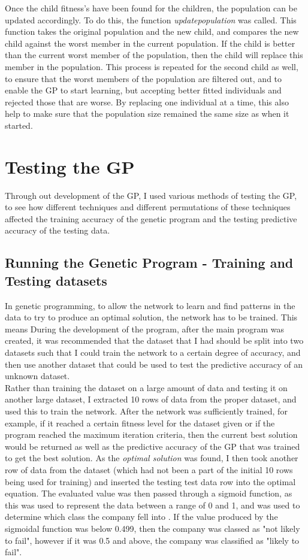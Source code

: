 \documentclass[11pt]{article}
\begin{document}
Once the child fitness's have been found for the children, the population can be updated accordingly. To do this, the function \textit{update\textunderscore population} was called. This function takes the original population and the new child, and compares the new child against the worst member in the current population. If the child is better than the current worst member of the population, then the child will replace this member in the population. This process is repeated for the second child as well, to ensure that the worst members of the population are filtered out, and to enable the GP to start learning, but accepting better fitted individuals and rejected those that are worse. By replacing one individual at a time, this also help to make sure that the population size remained the same size as when it started. 
\newpage
\section{Testing the GP}
Through out development of the GP, I used various methods of testing the GP, to see how different techniques and different permutations of these techniques affected the training accuracy of the genetic program and the testing predictive accuracy of the testing data. 

\subsection{Running the Genetic Program - Training and Testing datasets}

In genetic programming, to allow the network to learn and find patterns in the data to try to produce an optimal solution, the network has to be trained. This means 
During the development of the program, after the main program was created, it was recommended that the dataset that I had should be split into two datasets such that I could train the network to a certain degree of accuracy, and then use another dataset that could be used to test the predictive accuracy of an unknown dataset. \\
Rather than training the dataset on a large amount of data and testing it on another large dataset, I extracted 10 rows of data from the proper dataset, and used this to train the network. After the network was sufficiently trained, for example, if it reached a certain fitness level for the dataset given or if the program reached the maximum iteration criteria, then the current best solution would be returned as well as the predictive accuracy of the GP that was trained to get the best solution.  As the \textit{optimal solution} was found, I then took another row of data from the dataset (which had not been a part of the initial 10 rows being used for training) and inserted the testing test data row into the optimal equation. The evaluated value was then passed through a sigmoid function, as this was used to represent the data between a range of 0 and 1, and was used to determine which class the company fell into . If the value produced by the sigmoidal function was below 0.499, then the company was classed as "not likely to fail", however if it was 0.5 and above, the company was classified as "likely to fail".\\
\end{document}

